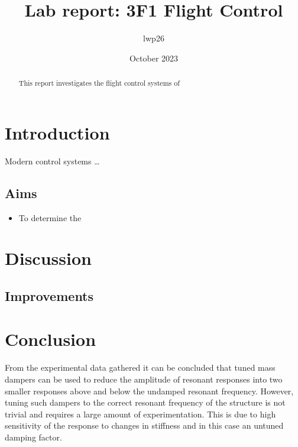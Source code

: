 \documentclass[8pt]{article}
\begin{document}

\title{Lab report: 3F1 Flight Control}
\author{lwp26}
\date{October 2023}
\maketitle

\begin{abstract}
    \centering
    This report investigates the flight control systems of 
\end{abstract}

\vspace{-14pt}
\section{Introduction}
\vspace{-14pt}


Modern control systems \dots

\vspace{-14pt}
\subsection{Aims}
\vspace{-14pt}

\begin{itemize}
\item To determine the 
\end{itemize}

\newpage


\section{Discussion}


\subsection{Improvements}

\vspace{-16pt}

\section{Conclusion}
\vspace{-16pt}

From the experimental data gathered it can be concluded that tuned mass dampers can be used to reduce the amplitude of resonant responses into two
smaller responses above and below the undamped resonant frequency.
However, tuning such dampers to the correct resonant frequency of the structure is not trivial and requires a large amount of experimentation.
This is due to high sensitivity of the response to changes in stiffness and in this case an untuned damping factor.
\end{document}
